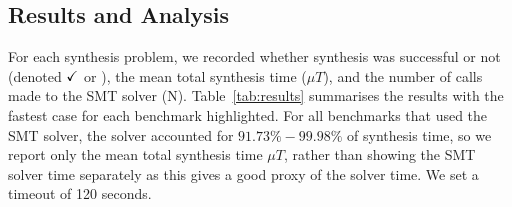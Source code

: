 \subsection{Results and Analysis}
%
For each synthesis problem, we recorded whether synthesis was successful or not
(denoted $\checkmark$ or \fail), the mean total synthesis time ($\mu{T}$), and the
number of calls made to the SMT solver (\textsc{N}). Table~\ref{tab:results}
summarises the results with the fastest case for each benchmark highlighted. For
all benchmarks that used the SMT solver, the solver accounted for
$91.73\%-99.98\%$ of synthesis time, so we report only the mean total synthesis
time $\mu{T}$, rather than showing the SMT solver time separately as this gives
a good proxy of the solver time. We set a timeout of 120 seconds.

\begin{table}[H]
{\small{
\begin{center}
\setlength{\tabcolsep}{0.3em}
\end{center}}}
\end{table}
